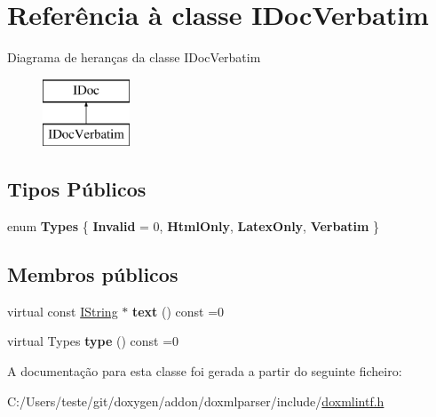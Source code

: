 \hypertarget{class_i_doc_verbatim}{\section{Referência à classe I\-Doc\-Verbatim}
\label{class_i_doc_verbatim}
}
Diagrama de heranças da classe I\-Doc\-Verbatim\begin{figure}[H]
\begin{center}
\leavevmode
\includegraphics[height=2.000000cm]{class_i_doc_verbatim}
\end{center}
\end{figure}
\subsection*{Tipos Públicos}
\begin{DoxyCompactItemize}
\item 
enum {\bfseries Types} \{ {\bfseries Invalid} = 0, 
{\bfseries Html\-Only}, 
{\bfseries Latex\-Only}, 
{\bfseries Verbatim}
 \}
\end{DoxyCompactItemize}
\subsection*{Membros públicos}
\begin{DoxyCompactItemize}
\item 
\hypertarget{class_i_doc_verbatim_aa487ae4b2bd6e3e7975ff2efe2666148}{virtual const \hyperlink{class_i_string}{I\-String} $\ast$ {\bfseries text} () const =0}\label{class_i_doc_verbatim_aa487ae4b2bd6e3e7975ff2efe2666148}

\item 
\hypertarget{class_i_doc_verbatim_a07f9c6361a316c0899d7e7338d045ec5}{virtual Types {\bfseries type} () const =0}\label{class_i_doc_verbatim_a07f9c6361a316c0899d7e7338d045ec5}

\end{DoxyCompactItemize}


A documentação para esta classe foi gerada a partir do seguinte ficheiro\-:\begin{DoxyCompactItemize}
\item 
C\-:/\-Users/teste/git/doxygen/addon/doxmlparser/include/\hyperlink{include_2doxmlintf_8h}{doxmlintf.\-h}\end{DoxyCompactItemize}
